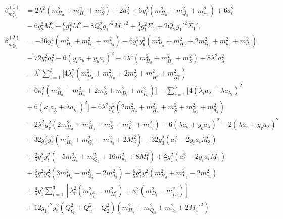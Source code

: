 \documentclass[preprint,amsmath,amssymb,aps,superscriptaddress,prd,showpacs,floatfix,nofootinbib]{revtex4-1}
\begin{document}
\begin{subequations}
\begin{align}
\beta_{m_{H_u}^2}^{(1)}&=2\lambda^2\left ( m_{H_d}^2+m_{H_u}^2+m_S^2\right )+2a_\lambda^2+6y_t^2\left ( m_{H_u}^2+m_{Q_3}^2+m_{u_3}^2\right )+6a_t^2\nonumber\\
&{}-6g_2^2M_2^2-\frac{6}{5}g_1^2M_1^2-8Q_2^2g_1'^2M_1'^2+\frac{3}{5}g_1^2\Sigma_1+2Q_2g_1'^2\Sigma_1',\label{eq:USSMmHu2BetaOneLoop}\\
\beta_{m_{H_u}^2}^{(2)}&=-36y_t^4\left ( m_{H_u}^2+m_{Q_3}^2+m_{u_3}^2\right )-6y_t^2y_b^2\left ( m_{H_u}^2+m_{H_d}^2+2m_{Q_3}^2+m_{u_3}^2+m_{d_3}^2\right )\nonumber\\
&{}-72y_t^2a_t^2-6\left ( y_ta_b+y_ba_t\right )^2-4\lambda^4\left ( m_{H_d}^2+m_{H_u}^2+m_S^2\right )-8\lambda^2a_{\lambda}^2\nonumber\\
&{}-\lambda^2\sum_{i=1}^3\bigg [ 4\lambda_i^2\left ( m_{H_d}^2+m_{H_u}^2+2m_S^2+m_{H_i^d}^2+m_{H_i^u}^2\right )\nonumber\\
&{}+6\kappa_i^2\left ( m_{H_d}^2+m_{H_u}^2+2m_S^2+m_{D_i}^2+m_{\overline{D}_i}^2\right )\bigg ]-\sum_{i=1}^3 \big [4\left ( \lambda_ia_{\lambda}+\lambda a_{\lambda_i}\right )^2\nonumber\\
&{}+6\left ( \kappa_i a_{\lambda}+\lambda a_{\kappa_i}\right )^2\big ]-6\lambda^2y_b^2\left ( 2m_{H_d}^2+m_{H_u}^2+m_S^2+m_{Q_3}^2+m_{d_3}^2\right )\nonumber\\
&{}-2\lambda^2y_\tau^2\left ( 2m_{H_d}^2+m_{H_u}^2+m_S^2+m_{L_3}^2+m_{e_3}^2\right )-6\left ( \lambda a_b+y_ba_{\lambda}\right )^2-2\left ( \lambda a_\tau+y_\tau a_{\lambda}\right )^2\nonumber\\
&{}+32g_3^2y_t^2\left ( m_{H_u}^2+m_{Q_3}^2+m_{u_3}^2+2M_3^2\right )+32g_3^2\left ( a_t^2-2y_ta_tM_3\right )\nonumber\\
&{}+\frac{2}{5}g_1^2y_t^2\left ( -5m_{H_u}^2+m_{Q_3}^2+16m_{u_3}^2+8M_1^2\right )+\frac{8}{5}g_1^2\left ( a_t^2-2y_ta_tM_1\right )\nonumber\\
&{}+\frac{6}{5}g_1^2y_b^2\left ( 3m_{H_d}^2-m_{Q_3}^2-2m_{d_3}^2\right )+\frac{6}{5}g_1^2y_\tau^2\left ( m_{H_d}^2+m_{L_3}^2-2m_{e_3}^2\right )\nonumber\\
&{}+\frac{6}{5}g_1^2\sum_{i=1}^3\left [ \lambda_i^2\left ( m_{H_i^d}^2-m_{H_i^u}^2\right )+\kappa_i^2\left ( m_{D_i}^2-m_{\overline{D}_i}^2\right )\right ]\nonumber\\
&{}+12g_1'^2y_t^2\left ( Q_Q^2+Q_u^2-Q_2^2\right )\left ( m_{H_u}^2+m_{Q_3}^2+m_{u_3}^2+2M_1'^2\right )\nonumber\\

\end{align}
\end{subequations}
\end{document}
